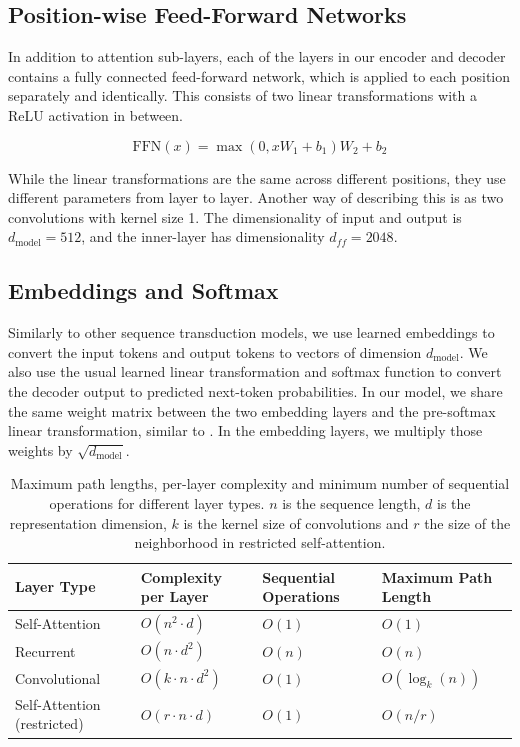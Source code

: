 \documentclass[12pt, a4paper]{article}
\begin{document}
\subsection{Position-wise Feed-Forward Networks}

In addition to attention sub-layers, each of the layers in our encoder and decoder contains a fully connected feed-forward network, which is applied to each position separately and identically. This consists of two linear transformations with a ReLU activation in between.

\begin{equation}
\text{FFN}( x ) = \max(0, xW_1 + b_1 ) W_2 + b_2
\label{eq:ffn}
\end{equation}

While the linear transformations are the same across different positions, they use different parameters from layer to layer. Another way of describing this is as two convolutions with kernel size 1. The dimensionality of input and output is $d_{\text{model}} = 512$, and the inner-layer has dimensionality $d_{ff} = 2048$.

\subsection{Embeddings and Softmax}

Similarly to other sequence transduction models, we use learned embeddings to convert the input tokens and output tokens to vectors of dimension $d_{\text{model}}$. We also use the usual learned linear transformation and softmax function to convert the decoder output to predicted next-token probabilities. In our model, we share the same weight matrix between the two embedding layers and the pre-softmax linear transformation, similar to \cite{30}. In the embedding layers, we multiply those weights by $\sqrt{d_{\text{model}}}$.

\begin{table}[H]
\centering
\caption{Maximum path lengths, per-layer complexity and minimum number of sequential operations for different layer types. $n$ is the sequence length, $d$ is the representation dimension, $k$ is the kernel size of convolutions and $r$ the size of the neighborhood in restricted self-attention.}
\begin{tabular}{llll}
\toprule
\textbf{Layer Type} & \textbf{Complexity per Layer} & \textbf{Sequential Operations} & \textbf{Maximum Path Length} \\
\midrule
Self-Attention & $O ( n^2 \cdot d )$ & $O (1)$ & $O (1)$ \\
Recurrent & $O ( n \cdot d^2 )$ & $O ( n )$ & $O ( n )$ \\
Convolutional & $O ( k \cdot n \cdot d^2 )$ & $O (1)$ & $O ( \log_k ( n ))$ \\
Self-Attention (restricted) & $O ( r \cdot n \cdot d )$ & $O (1)$ & $O ( n/r )$ \\
\bottomrule
\end{tabular}
\label{tab:complexity}
\end{table}
\end{document}
